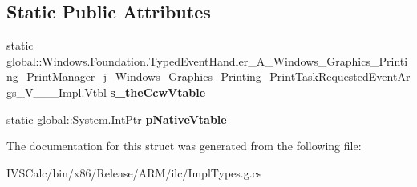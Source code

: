 \subsection*{Static Public Attributes}
\begin{DoxyCompactItemize}
\item 
\mbox{\label{struct_windows_1_1_foundation_1_1_typed_event_handler___a___windows___graphics___printing___prindf9d13d6fccfa5e25b1b30b98b5a86a9_ae8d9f0bc59eb4c31f1aa690d74e37e90}} 
static global\+::\+Windows.\+Foundation.\+Typed\+Event\+Handler\+\_\+\+A\+\_\+\+Windows\+\_\+\+Graphics\+\_\+\+Printing\+\_\+\+Print\+Manager\+\_\+j\+\_\+\+Windows\+\_\+\+Graphics\+\_\+\+Printing\+\_\+\+Print\+Task\+Requested\+Event\+Args\+\_\+\+V\+\_\+\+\_\+\+\_\+\+Impl.\+Vtbl {\bfseries s\+\_\+the\+Ccw\+Vtable}
\item 
\mbox{\label{struct_windows_1_1_foundation_1_1_typed_event_handler___a___windows___graphics___printing___prindf9d13d6fccfa5e25b1b30b98b5a86a9_ad55ea3fbcc0efa9c5c1cd59b835e91ea}} 
static global\+::\+System.\+Int\+Ptr {\bfseries p\+Native\+Vtable}
\end{DoxyCompactItemize}


The documentation for this struct was generated from the following file\+:\begin{DoxyCompactItemize}
\item 
I\+V\+S\+Calc/bin/x86/\+Release/\+A\+R\+M/ilc/Impl\+Types.\+g.\+cs\end{DoxyCompactItemize}
